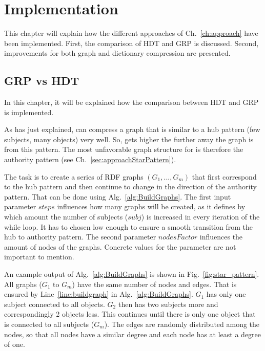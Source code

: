 \chapter{Implementation}\label{ch:implementation}

This chapter will explain how the different approaches of Ch.~\ref{ch:approach} have been implemented. First, the comparison of HDT and GRP is discussed. Second, improvements for both graph and dictionary compression are presented.

\section{GRP vs HDT}\label{sec:implementationGRPvsHDT}

In this chapter, it will be explained how the comparison between HDT and GRP is implemented.

As has just explained, \GHDT{} can compress a graph that is similar to a hub pattern (few subjects, many objects) very well. So,  gets higher the further away the graph is from this pattern. The most unfavorable graph structure for \GHDT{} is therefore the authority pattern (see Ch.~\ref{sec:approachStarPattern}).

The task is to create a series of RDF graphs $(G_1,...,G_m)$ that first correspond to the hub pattern and then continue to change in the direction of the authority pattern. That can be done using Alg.~\ref{alg:BuildGraphs}. The first input parameter $steps$ influences how many graphs will be created, as it defines by which amount the number of subjects ($subj$) is increased in every iteration of the while loop. It has to chosen low enough to ensure a smooth transition from the hub to authority pattern. The second parameter $nodesFactor$ influences the amount of nodes of the graphs. Concrete values for the parameter are not important to mention.

An example output of Alg.~\ref{alg:BuildGraphs} is shown in Fig.~\ref{fig:star_pattern}. All graphs ($G_1$ to $G_m$) have the same number of nodes and edges. That is ensured by Line~\ref{line:buildgraph} in Alg.~\ref{alg:BuildGraphs}. $G_1$ has only one subject connected to all objects. $G_2$ then has two subjects more and correspondingly 2 objects less. This continues until there is only one object that is connected to all subjects ($G_m$). The edges are randomly distributed among the nodes, so that all nodes have a similar degree and each node has at least a degree of one.

